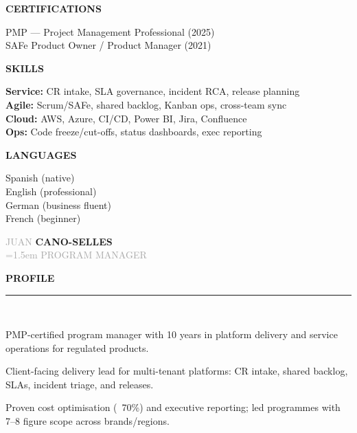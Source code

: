 \documentclass[12pt,a4paper]{article}
\newcommand{\headleft}[1]{%
  \vspace*{2ex}\textsc{\textbf{\color{softwhite}#1}}\par%
  \vspace*{-1.2ex}{\color{softwhite}\hrulefill}\par\vspace*{0.8ex}
}
\newcommand{\headright}[1]{%
  \vspace{0.6ex}%
  {\sffont\bfseries\large\addfontfeatures{LetterSpace=2.0}\textcolor{cvblue}{\MakeUppercase{#1}}}\\[-1ex]%
  {\color{cvblue}\rule{\dimexpr\linewidth\relax}{0.6pt}}\\[-0.4ex]%
}
\newlength{\SideBarW}
\begin{document}
\begin{minipage}[t]{\textwidth}
{{\begin{minipage}[t]{\dimexpr\linewidth-8mm\relax}
      \vspace*{3mm}

      \headleft{CERTIFICATIONS}
      PMP — Project Management Professional (2025)\\[0.6ex]
      SAFe Product Owner / Product Manager (2021)

      \vspace*{3mm}

      \headleft{SKILLS}
      \textbf{Service:} CR intake, SLA governance, incident RCA, release planning\\[0.4ex]
      \textbf{Agile:} Scrum/SAFe, shared backlog, Kanban ops, cross-team sync\\[0.4ex]
      \textbf{Cloud:} AWS, Azure, CI/CD, Power BI, Jira, Confluence\\[0.4ex]
      \textbf{Ops:} Code freeze/cut-offs, status dashboards, exec reporting

      \vspace*{3mm}

      \headleft{LANGUAGES}
      Spanish (native)\\[0.4ex]
      English (professional)\\[0.4ex]
      German (business fluent)\\[0.4ex]
      French (beginner)

    \end{minipage}
  }%
}%
\hspace{4mm}%
\begin{minipage}[t]{\dimexpr\textwidth-\SideBarW-4mm\relax}
  \raggedright
  \setlength{\parskip}{0.48ex}

\vspace*{14mm}
\begin{center}
  {\sffont\fontsize{40}{42}\textcolor{darkgray}{JUAN}}%
  \hspace{1.2em}%
  {\sffont\fontsize{40}{42}\bfseries{}\textcolor{cvblue}{CANO-SELLES}}\\[2ex]
  {\sffont\fontsize{16}{18}\textcolor{darkgray}{\spaceskip=1.5em PROGRAM MANAGER}}
\end{center}

\vspace{3mm}

\headright{Profile}
\vspace*{-0.4ex}
\begin{cvitemize}
  \item PMP-certified program manager with 10 years in platform delivery and service operations for regulated products.
  \item Client-facing delivery lead for multi-tenant platforms: CR intake, shared backlog, SLAs, incident triage, and releases.
  \item Proven cost optimisation (~70\%) and executive reporting; led programmes with 7–8 figure scope across brands/regions.
\end{cvitemize}


\end{minipage}
\end{minipage}
\end{document}
